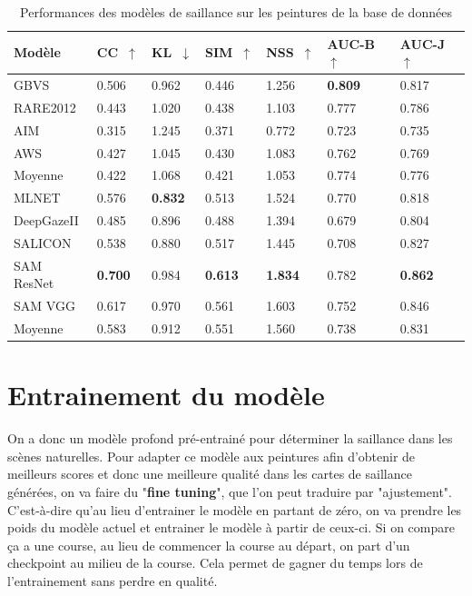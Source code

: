 \begin{table}[ht]
    \centering
        \begin{tabular}{|l|l|l|l|l|l|l|}
		\hline
        Modèle & CC~$\uparrow$ & KL~$\downarrow$ & SIM~$\uparrow$ & NSS~$\uparrow$ & AUC-B~$\uparrow$ & AUC-J~$\uparrow$\\
		\hline
        GBVS        & 0.506 & 0.962 & 0.446 & 1.256 & \textbf{0.809} & 0.817\\
        RARE2012    & 0.443 & 1.020 & 0.438 & 1.103 & 0.777 & 0.786\\
        AIM         & 0.315 & 1.245 & 0.371 & 0.772 & 0.723 & 0.735\\
        AWS         & 0.427 & 1.045 & 0.430 & 1.083 & 0.762 & 0.769\\
		\hline
        Moyenne     & 0.422 & 1.068 & 0.421 & 1.053 & 0.774 & 0.776\\
		\hline
        MLNET       & 0.576 & \textbf{0.832} & 0.513 & 1.524 & 0.770 & 0.818\\
        DeepGazeII  & 0.485 & 0.896 & 0.488 & 1.394 & 0.679 & 0.804\\
        SALICON     & 0.538 & 0.880 & 0.517 & 1.445 & 0.708 & 0.827\\
        SAM ResNet  & \textbf{0.700} & 0.984 & \textbf{0.613} & \textbf{1.834} & 0.782 & \textbf{0.862}\\
        SAM VGG     & 0.617 & 0.970 & 0.561 & 1.603 & 0.752 & 0.846\\
		\hline
        Moyenne     & 0.583 & 0.912 & 0.551 & 1.560 & 0.738 & 0.831\\
		\hline
        \end{tabular}
    \caption{Performances des modèles de saillance sur les peintures de la base de données}
    \label{tab:scores}
\end{table}

\vfill

\newpage
\section{Entrainement du modèle}

\par
On a donc un modèle profond pré-entrainé pour déterminer la saillance dans les scènes naturelles. Pour adapter ce modèle aux peintures afin d'obtenir de meilleurs scores et donc une meilleure qualité dans les cartes de saillance générées, on va faire du "\textbf{fine tuning}", que l'on peut traduire par "ajustement". C'est-à-dire qu'au lieu d'entrainer le modèle en partant de zéro, on va prendre les poids du modèle actuel et entrainer le modèle à partir de ceux-ci. Si on compare ça a une course, au lieu de commencer la course au départ, on part d'un checkpoint au milieu de la course. Cela permet de gagner du temps lors de l'entrainement sans perdre en qualité.


